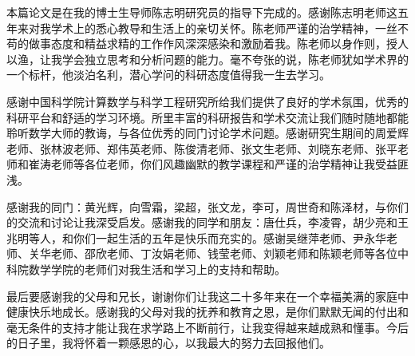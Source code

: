 本篇论文是在我的博士生导师陈志明研究员的指导下完成的。感谢陈志明老师这五年来对我学术上的悉心教导和生活上的亲切关怀。陈老师严谨的治学精神，一丝不苟的做事态度和精益求精的工作作风深深感染和激励着我。陈老师以身作则，授人以渔，让我学会独立思考和分析问题的能力。毫不夸张的说，陈老师犹如学术界的一个标杆，他淡泊名利，潜心学问的科研态度值得我一生去学习。

感谢中国科学院计算数学与科学工程研究所给我们提供了良好的学术氛围，优秀的科研平台和舒适的学习环境。所里丰富的科研报告和学术交流让我们随时随地都能聆听数学大师的教诲，与各位优秀的同门讨论学术问题。感谢研究生期间的周爱辉老师、张林波老师、郑伟英老师、陈俊清老师、张文生老师、刘晓东老师、张平老师和崔涛老师等各位老师，你们风趣幽默的教学课程和严谨的治学精神让我受益匪浅。


感谢我的同门：黄光辉，向雪霜，梁超，张文龙，李可，周世奇和陈泽材，与你们的交流和讨论让我深受启发。感谢我的同学和朋友：唐仕兵，李凌霄，胡少亮和王兆明等人，和你们一起生活的五年是快乐而充实的。感谢吴继萍老师、尹永华老师、关华老师、邵欣老师、丁汝娟老师、钱莹老师、刘颖老师和陈颖老师等各位中科院数学学院的老师们对我生活和学习上的支持和帮助。

最后要感谢我的父母和兄长，谢谢你们让我这二十多年来在一个幸福美满的家庭中健康快乐地成长。感谢我的父母对我的抚养和教育之恩，是你们默默无闻的付出和毫无条件的支持才能让我在求学路上不断前行，让我变得越来越成熟和懂事。今后的日子里，我将怀着一颗感恩的心，以我最大的努力去回报他们。
